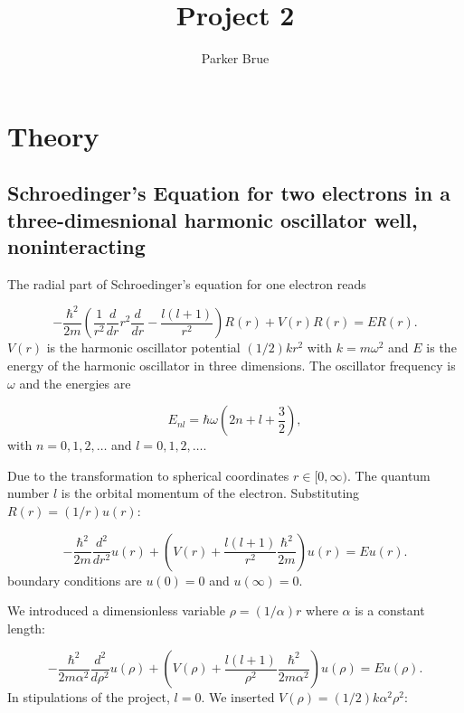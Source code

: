 \documentclass[10pt,showpacs,preprintnumbers,footinbib,amsmath,amssymb,aps,prl,twocolumn,groupedaddress,superscriptaddress,showkeys]{revtex4-1}
\begin{document}
\title{Project 2}
\author{Parker Brue}

\maketitle

\section{Theory}
	\subsection{Schroedinger's Equation for two electrons in a three-dimesnional harmonic oscillator well, noninteracting}	
The radial part of Schroedinger's equation for one electron reads

\begin{equation*}
	-\frac{\hbar^2}{2 m} \left ( \frac{1}{r^2} \frac{d}{dr} r^2
	\frac{d}{dr} - \frac{l (l + 1)}{r^2} \right )R(r) 
	+ V(r) R(r) = E R(r).
\end{equation*}
$V(r)$ is the harmonic oscillator potential $(1/2)kr^2$ with
$k=m\omega^2$ and $E$ is
the energy of the harmonic oscillator in three dimensions.
The oscillator frequency is $\omega$ and the energies are

\begin{equation*}
	E_{nl}=  \hbar \omega \left(2n+l+\frac{3}{2}\right),
\end{equation*}
with $n=0,1,2,\dots$ and $l=0,1,2,\dots$.

Due to the transformation to spherical coordinates
$r\in [0,\infty)$.  
The quantum number
$l$ is the orbital momentum of the electron.  
% 
Substituting $R(r) = (1/r) u(r)$:
% 

\begin{equation*}
	-\frac{\hbar^2}{2 m} \frac{d^2}{dr^2} u(r) 
	+ \left ( V(r) + \frac{l (l + 1)}{r^2}\frac{\hbar^2}{2 m}
	\right ) u(r)  = E u(r) .
\end{equation*}
% 
boundary conditions are $u(0)=0$ and $u(\infty)=0$.

We introduced a dimensionless variable $\rho = (1/\alpha) r$
where $\alpha$ is a constant length:
% 

\begin{equation*}
	-\frac{\hbar^2}{2 m \alpha^2} \frac{d^2}{d\rho^2} u(\rho) 
	+ \left ( V(\rho) + \frac{l (l + 1)}{\rho^2}
	\frac{\hbar^2}{2 m\alpha^2} \right ) u(\rho)  = E u(\rho) .
\end{equation*}
% 
In stipulations of the project, $l=0$.
We inserted $V(\rho) = (1/2) k \alpha^2\rho^2$:
\end{document}
